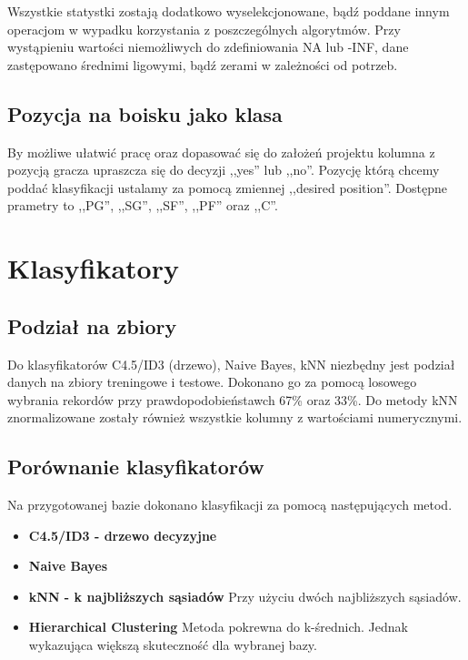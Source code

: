 \documentclass[twoside,twocolumn]{article}
\begin{document}
Wszystkie statystki zostają dodatkowo wyselekcjonowane, bądź poddane innym operacjom w wypadku korzystania z poszczególnych algorytmów. Przy wystąpieniu wartości niemożliwych do zdefiniowania NA lub -INF, dane zastępowano średnimi ligowymi, bądź zerami w zależności od potrzeb.
\subsection{Pozycja na boisku jako klasa}
By możliwe ułatwić pracę oraz dopasować się do założeń projektu kolumna z pozycją gracza upraszcza się do decyzji ,,yes'' lub ,,no''. Pozycję którą chcemy poddać klasyfikacji ustalamy za pomocą zmiennej ,,desired position''. Dostępne prametry to ,,PG'', ,,SG'', ,,SF'', ,,PF'' oraz ,,C''.

\section{Klasyfikatory}
\subsection{Podział na zbiory}
\indent Do klasyfikatorów C4.5/ID3 (drzewo), Naive Bayes, kNN niezbędny jest podział danych na zbiory treningowe i testowe. Dokonano go za pomocą losowego wybrania rekordów przy prawdopodobieństawch 67\% oraz 33\%. Do metody kNN znormalizowane zostały również wszystkie kolumny z wartościami numerycznymi.
\newpage
\subsection{Porównanie klasyfikatorów}
\indent Na przygotowanej bazie dokonano klasyfikacji za pomocą następujących metod.
\begin{itemize}
\item \textbf{C4.5/ID3 - drzewo decyzyjne}
\item \textbf{Naive Bayes}
\item \textbf{kNN - k najbliższych sąsiadów}
Przy użyciu dwóch najbliższych sąsiadów.
\item \textbf{Hierarchical Clustering}
Metoda pokrewna do k-średnich. Jednak wykazująca większą skuteczność dla wybranej bazy.
\end{itemize}
\end{document}
